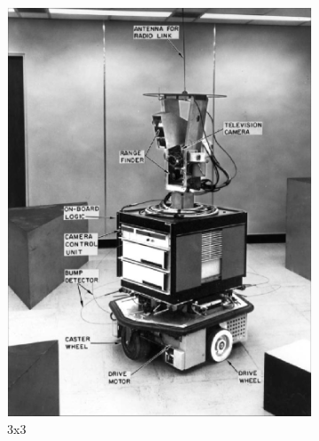 \documentclass[lettersize,journal]{IEEEtran}
\begin{document}
\begin{figure}[h]
    \centering 
    \begin{subfigure}[h]{0.115\textwidth}
        \centering 
        \includegraphics[width=\linewidth]{gaussian_map_3x3_sigma_1}
        \caption{3x3}  
    \end{subfigure}
    \begin{subfigure}[h]{0.115\textwidth}
        \centering 

\end{subfigure}
\end{figure}
\end{document}

